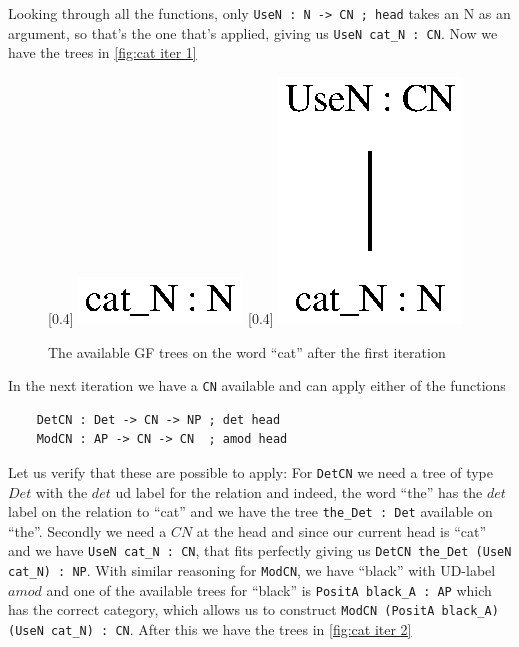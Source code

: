 Looking through all the functions, only \lstinline|UseN : N -> CN ; head| takes an N as an argument, so that's the one that's applied, giving us \lstinline|UseN cat_N : CN|. Now we have the trees in \autoref{fig:cat iter 1}

\begin{figure}[H]
    \centering
    [0.4\textwidth]
        {\includegraphics[scale=0.75]{thesis/figure/black_cats/cat_N_gf.eps}}
    [0.4\textwidth]
        {\includegraphics[scale=0.75]{thesis/figure/black_cats/cat_CN_gf.eps}}
    \caption{The available GF trees on the word ``cat'' after the first iteration}\label{fig:cat iter 1}
\end{figure}

In the next iteration we have a \lstinline|CN| available and can apply either of the functions
\begin{lstlisting}
    DetCN : Det -> CN -> NP ; det head
    ModCN : AP -> CN -> CN  ; amod head
\end{lstlisting}
Let us verify that these are possible to apply: For \lstinline|DetCN| we need a tree of type $Det$ with the $det$ ud label for the relation and indeed, the word ``the'' has the $det$ label on the relation to ``cat'' and we have the tree \lstinline|the_Det : Det| available on ``the''. Secondly we need a $CN$ at the head and since our current head is ``cat'' and we have \lstinline|UseN cat_N : CN|, that fits perfectly giving us \lstinline|DetCN the_Det (UseN cat_N) : NP|. With similar reasoning for \lstinline{ModCN}, we have ``black'' with UD-label $amod$ and one of the available trees for ``black'' is \lstinline|PositA black_A : AP| which has the correct category, which allows us to construct \lstinline|ModCN (PositA black_A) (UseN cat_N) : CN|. After this we have the trees in \autoref{fig:cat iter 2}

